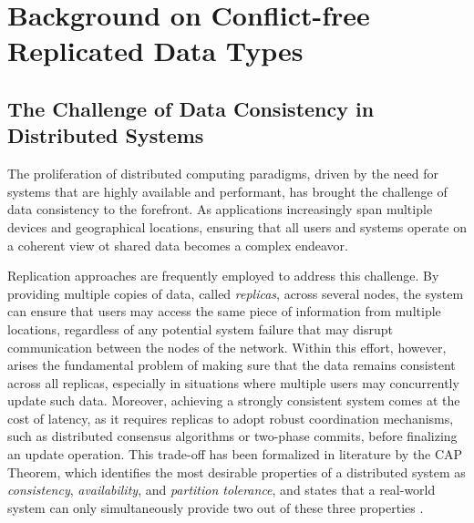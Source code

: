 \chapter{Background on Conflict-free Replicated Data Types}

\section{The Challenge of Data Consistency in Distributed Systems}

The proliferation of distributed computing paradigms, driven by the need for systems that are
highly available and performant, has brought the challenge of data consistency to the
forefront. As applications increasingly span multiple devices and geographical locations,
ensuring that all users and systems operate on a coherent view ot shared data becomes a
complex endeavor.

Replication approaches are frequently employed to address this challenge. By providing
multiple copies of data, called \textit{replicas}, across several nodes, the system can
ensure that users may access the same piece of information from multiple locations,
regardless of any potential system failure that may disrupt communication between the nodes
of the network. Within this effort, however, arises the fundamental problem of making sure
that the data remains consistent across all replicas, especially in situations where
multiple users may concurrently update such data. Moreover, achieving a strongly consistent
system comes at the cost of latency, as it requires replicas to adopt robust coordination
mechanisms, such as distributed consensus algorithms or two-phase commits, before finalizing
an update operation. This trade-off has been formalized in literature by the CAP Theorem,
which identifies the most desirable properties of a distributed system as
\textit{consistency}, \textit{availability}, and \textit{partition tolerance}, and
states that a real-world system can only simultaneously provide two out of these three
properties \cite{gilbert2002brewers}.

